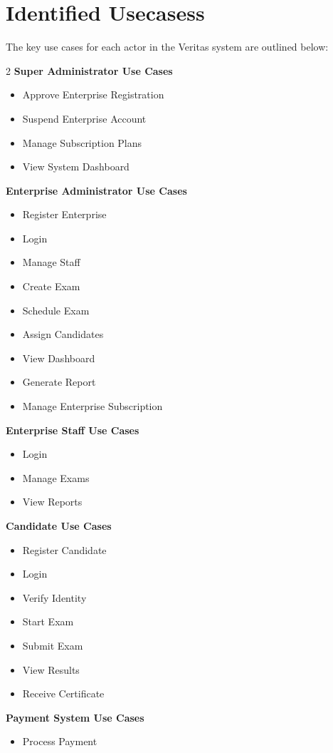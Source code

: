\section*{Identified Usecasess}
The key use cases for each actor in the Veritas system are outlined below:
\begin{multicols}{2}\raggedcolumns
\textbf{Super Administrator Use Cases}
\begin{itemize}
    \item Approve Enterprise Registration
    \item Suspend Enterprise Account
    \item Manage Subscription Plans
    \item View System Dashboard
\end{itemize}

\textbf{Enterprise Administrator Use Cases}
\begin{itemize}
    \item Register Enterprise
    \item Login
    \item Manage Staff
    \item Create Exam
    \item Schedule Exam
    \item Assign Candidates
    \item View Dashboard
    \item Generate Report
    \item Manage Enterprise Subscription
\end{itemize}

\textbf{Enterprise Staff Use Cases}
\begin{itemize}
    \item Login
    \item Manage Exams
    \item View Reports
\end{itemize}

\textbf{Candidate Use Cases}
\begin{itemize}
    \item Register Candidate
    \item Login
    \item Verify Identity
    \item Start Exam
    \item Submit Exam
    \item View Results
    \item Receive Certificate
\end{itemize}

\textbf{Payment System Use Cases}
\begin{itemize}
    \item Process Payment
\end{itemize}
\end{multicols}


